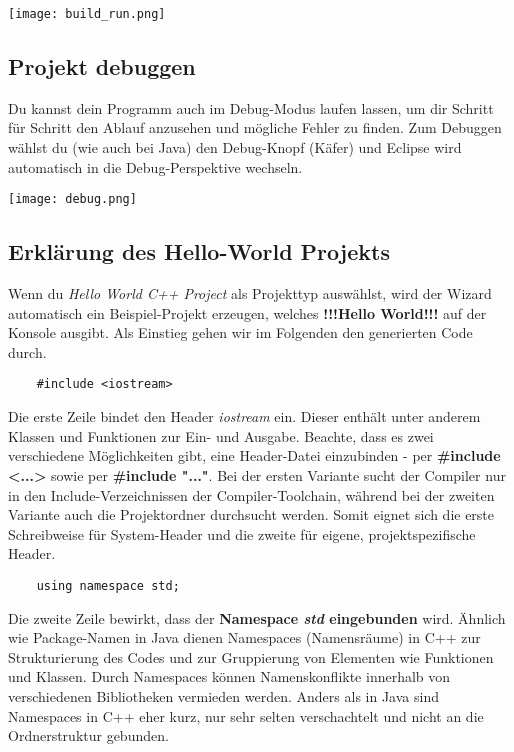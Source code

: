 \begin{center}
\texttt{[image: build\_run.png]}
\end{center}

\subsection{Projekt debuggen}
Du kannst dein Programm auch im Debug-Modus laufen lassen, um dir Schritt für Schritt den Ablauf anzusehen und mögliche Fehler zu finden.
Zum Debuggen wählst du (wie auch bei Java) den Debug-Knopf (\glqq Käfer\grqq) und Eclipse wird automatisch in die Debug-Perspektive wechseln.

\texttt{[image: debug.png]}

\subsection{Erklärung des Hello-World Projekts}
Wenn du \emph{Hello World C++ Project} als Projekttyp auswählst, wird der Wizard automatisch ein Beispiel-Projekt erzeugen, welches \textbf{!!!Hello World!!!} auf der Konsole ausgibt.
Als Einstieg gehen wir im Folgenden den generierten Code durch.

\begin{lstlisting}
	#include <iostream>
\end{lstlisting}

Die erste Zeile bindet den Header \emph{iostream} ein.
Dieser enthält unter anderem Klassen und Funktionen zur Ein- und Ausgabe.
Beachte, dass es zwei verschiedene Möglichkeiten gibt, eine Header-Datei einzubinden -  per \textbf{\#include <...>} sowie per \textbf{\#include "..."}. Bei der ersten Variante sucht der Compiler nur in den Include-Verzeichnissen der Compiler-Toolchain, während bei der zweiten Variante auch die Projektordner durchsucht werden. Somit eignet sich die erste Schreibweise für System-Header und die zweite für eigene, projektspezifische Header.

\begin{lstlisting}
	using namespace std;
\end{lstlisting}
Die zweite Zeile bewirkt, dass der \textbf{Namespace \emph{std} eingebunden} wird. Ähnlich wie Package-Namen in Java dienen Namespaces (Namensräume) in C++ zur Strukturierung des Codes und zur Gruppierung von Elementen wie Funktionen und Klassen.
Durch Namespaces können Namenskonflikte innerhalb von verschiedenen Bibliotheken vermieden werden.
Anders als in Java sind Namespaces in C++ eher kurz, nur sehr selten verschachtelt und nicht an die Ordnerstruktur gebunden.


